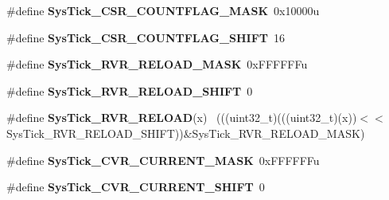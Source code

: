 \begin{DoxyCompactItemize}
\item 
\hypertarget{group___sys_tick___register___masks_ga5ae827629fd47e5a050f706576f7b425}{}\#define {\bfseries Sys\+Tick\+\_\+\+C\+S\+R\+\_\+\+C\+O\+U\+N\+T\+F\+L\+A\+G\+\_\+\+M\+A\+S\+K}~0x10000u\label{group___sys_tick___register___masks_ga5ae827629fd47e5a050f706576f7b425}

\item 
\hypertarget{group___sys_tick___register___masks_ga9764e4e8c4ee1b8383ec52f061bd1c87}{}\#define {\bfseries Sys\+Tick\+\_\+\+C\+S\+R\+\_\+\+C\+O\+U\+N\+T\+F\+L\+A\+G\+\_\+\+S\+H\+I\+F\+T}~16\label{group___sys_tick___register___masks_ga9764e4e8c4ee1b8383ec52f061bd1c87}

\item 
\hypertarget{group___sys_tick___register___masks_gaec96452b3f6bd6a6ca6496cbbad9a9aa}{}\#define {\bfseries Sys\+Tick\+\_\+\+R\+V\+R\+\_\+\+R\+E\+L\+O\+A\+D\+\_\+\+M\+A\+S\+K}~0x\+F\+F\+F\+F\+F\+Fu\label{group___sys_tick___register___masks_gaec96452b3f6bd6a6ca6496cbbad9a9aa}

\item 
\hypertarget{group___sys_tick___register___masks_gaada5987ab8604965af6e1437c97ee963}{}\#define {\bfseries Sys\+Tick\+\_\+\+R\+V\+R\+\_\+\+R\+E\+L\+O\+A\+D\+\_\+\+S\+H\+I\+F\+T}~0\label{group___sys_tick___register___masks_gaada5987ab8604965af6e1437c97ee963}

\item 
\hypertarget{group___sys_tick___register___masks_gabe33788bbfefe67549f0da8cabbc2495}{}\#define {\bfseries Sys\+Tick\+\_\+\+R\+V\+R\+\_\+\+R\+E\+L\+O\+A\+D}(x)                                    ~(((uint32\+\_\+t)(((uint32\+\_\+t)(x))$<$$<$Sys\+Tick\+\_\+\+R\+V\+R\+\_\+\+R\+E\+L\+O\+A\+D\+\_\+\+S\+H\+I\+F\+T))\&Sys\+Tick\+\_\+\+R\+V\+R\+\_\+\+R\+E\+L\+O\+A\+D\+\_\+\+M\+A\+S\+K)\label{group___sys_tick___register___masks_gabe33788bbfefe67549f0da8cabbc2495}

\item 
\hypertarget{group___sys_tick___register___masks_ga24c6d345c97c669b426339ffda71aa8b}{}\#define {\bfseries Sys\+Tick\+\_\+\+C\+V\+R\+\_\+\+C\+U\+R\+R\+E\+N\+T\+\_\+\+M\+A\+S\+K}~0x\+F\+F\+F\+F\+F\+Fu\label{group___sys_tick___register___masks_ga24c6d345c97c669b426339ffda71aa8b}

\item 
\hypertarget{group___sys_tick___register___masks_ga1e9eb575c58a4638dabd21775fa22c19}{}\#define {\bfseries Sys\+Tick\+\_\+\+C\+V\+R\+\_\+\+C\+U\+R\+R\+E\+N\+T\+\_\+\+S\+H\+I\+F\+T}~0\label{group___sys_tick___register___masks_ga1e9eb575c58a4638dabd21775fa22c19}


\end{DoxyCompactItemize}
